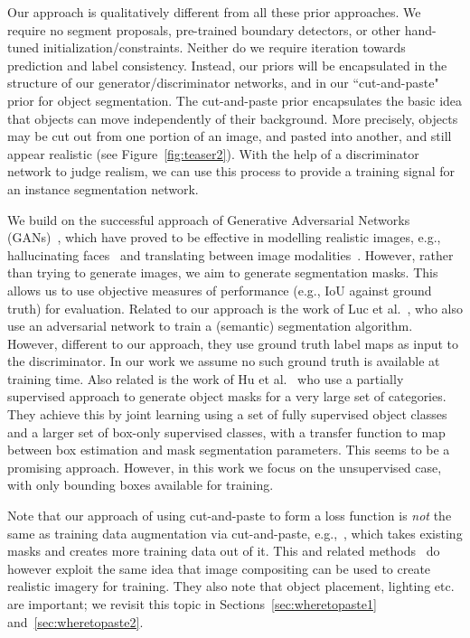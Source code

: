 \documentclass[runningheads]{llncs}
\begin{document}
Our approach is qualitatively different from all these prior approaches. We require no segment proposals, pre-trained boundary detectors, or other hand-tuned initialization/constraints. Neither do we require iteration towards prediction and label consistency. Instead, our priors will be encapsulated in the structure of our generator/discriminator networks, and in our ``cut-and-paste" prior for object segmentation. 
The cut-and-paste prior encapsulates the basic idea that objects can move independently of their background. More precisely, objects may be cut out from one portion of an image, and pasted into another, and still appear realistic (see Figure~\ref{fig:teaser2}). With the help of a discriminator network to judge realism, we can use this process to provide a training signal for an instance segmentation network. 

We build on the successful approach of Generative Adversarial Networks (GANs)~\cite{goodfellow2014generative},
which have proved to be effective in modelling realistic images, e.g., hallucinating faces~\cite{karras2017progressive} and translating between image modalities~\cite{isola2017image}. 
However, rather than trying to generate images, we aim to generate segmentation masks. This allows us to use objective measures of performance (e.g., IoU against ground truth) for evaluation.
Related to our approach is the work of Luc et al.~\cite{luc2016semantic}, who also use an adversarial network to train a (semantic) segmentation algorithm. However, different to our approach, they use ground truth label maps as input to the discriminator. In our work we assume no such ground truth is available at training time.
Also related is the work of Hu et al.~\cite{hu2017learning} who use a partially supervised approach to generate object masks for a very large set of categories. 
They achieve this by joint learning using a set of fully supervised object classes and a larger set of box-only supervised classes, with a transfer function to map between box estimation and mask segmentation parameters. 
This seems to be a promising approach. 
However, in this work we focus on the unsupervised case, with only bounding boxes available for training.

Note that our approach of using cut-and-paste to form a loss function is \emph{not} the same as training data augmentation via cut-and-paste, e.g.,~\cite{dwibedi2017cut}, which takes existing masks and creates more training data out of it. This and related methods~\cite{georgakis2017synthesizing,alhaija2017augmented} do however exploit the same idea that image compositing can be used to create realistic imagery for training. They also note that object placement, lighting etc. are important; we revisit this topic in Sections~\ref{sec:wheretopaste1} and~\ref{sec:wheretopaste2}.
\end{document}
